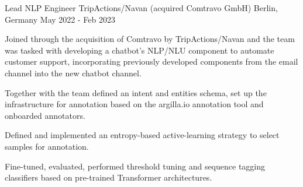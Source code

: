 \begin{cventries}
	

  \cventry
    {Lead NLP Engineer} %
    {TripActions/Navan (acquired Comtravo GmbH)} %
    {Berlin, Germany} %
    {May 2022 - Feb 2023} %
	{
      \begin{cvitems} %
		\item {Joined through the acquisition of Comtravo by TripActions/Navan and the team was tasked with developing a chatbot's NLP/NLU component to automate customer support, incorporating previously developed components from the email channel into the new chatbot channel.}
		\item {Together with the team defined an intent and entities schema, set up the infrastructure for annotation based on the argilla.io annotation tool and onboarded annotators.}
		\item {Defined and implemented an entropy-based active-learning strategy to select samples for annotation.}
		\item {Fine-tuned, evaluated, performed threshold tuning and sequence tagging classifiers based on pre-trained Transformer architectures.}
      \end{cvitems}
    }




\end{cventries}
